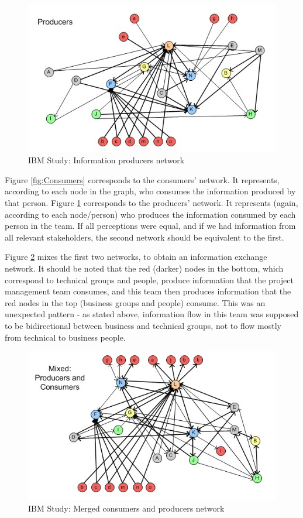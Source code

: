 \begin{figure}[tbp]
\centering
\includegraphics[scale=1.0]{producers}
\caption{\label{fig:Producers}IBM Study: Information producers network}
\end{figure}

Figure \ref{fig:Consumers} corresponds to the consumers' network. It represents, according to each node in the graph, who consumes the information produced by that person. Figure \ref{fig:Producers} corresponds to the producers' network. It represents (again, according to each node/person) who produces the information consumed by each person in the team. If all perceptions were equal, and if we had information from all relevant stakeholders, the second network should be equivalent to the first.

Figure \ref{fig:Mixed} mixes the first two networks, to obtain an information exchange network. It should be noted that the red (darker) nodes in the bottom, which correspond to technical groups and people, produce information that the project management team consumes, and this team then produces information that the red nodes in the top (business groups and people) consume. This was an unexpected pattern - as stated above, information flow in this team was supposed to be bidirectional between business and technical groups, not to flow mostly from technical to business people.


\begin{figure}[tbp]
\centering
\includegraphics[scale=1.0]{mixed}
\caption{\label{fig:Mixed}IBM Study: Merged consumers and producers network}
\end{figure}

